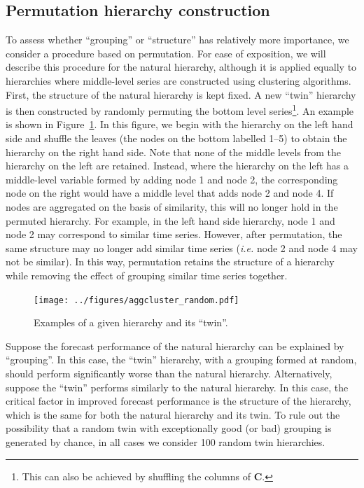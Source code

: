 \documentclass[a4paper,review,12pt,authoryear]{elsarticle}
\begin{document}
\subsection{Permutation hierarchy construction}
\label{subsec:permutation}

 


To assess whether ``grouping'' or ``structure'' has relatively more importance, we consider a procedure based on permutation. For ease of exposition, we will describe this procedure for the natural hierarchy, although it is applied equally to hierarchies where middle-level series are constructed using clustering algorithms. First, the structure of the natural hierarchy is kept fixed. A new ``twin'' hierarchy is then constructed by randomly permuting the bottom level series\footnote{This can also be achieved by shuffling the columns of $\boldsymbol{C}$.}. An example is shown in Figure~\ref{fig:aggcluster_random}. { In this figure, we begin with the hierarchy on the left hand side and shuffle the leaves (the nodes on the bottom labelled 1--5) to obtain the hierarchy on the right hand side. Note that none of the middle levels from the hierarchy on the left are retained. Instead, where the hierarchy on the left has a middle-level variable formed by adding node 1 and node 2, the corresponding node on the right would have a middle level that adds node 2 and node 4. %
If nodes are aggregated on the basis of similarity, this will no longer hold in the permuted hierarchy. For example, in the left hand side hierarchy, node 1 and node 2 may correspond to similar time series. However, after permutation, the same structure may no longer add similar time series (\textit{i.e.} node 2 and node 4 may not be similar). In this way, permutation retains the structure of a hierarchy while removing the effect of grouping similar time series together.}



\begin{figure}[h!]
    \centering
    \texttt{[image: ../figures/aggcluster\_random.pdf]}
\caption{\label{fig:aggcluster_random}Examples of a given hierarchy and its ``twin''. }
\end{figure}

Suppose the forecast performance of the natural hierarchy can be explained by ``grouping''. In this case, the ``twin'' hierarchy, with a grouping formed at random, should perform significantly worse than the natural hierarchy. Alternatively, suppose the ``twin'' performs similarly to the natural hierarchy. In this case, the critical factor in improved forecast performance is the structure of the hierarchy, which is the same for both the natural hierarchy and its twin. To rule out the possibility that a random twin with exceptionally good (or bad) grouping is generated by chance, in all cases we consider 100 random twin hierarchies.
\end{document}
